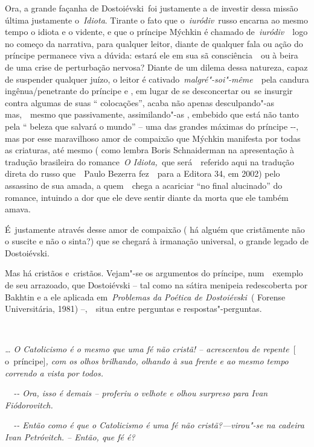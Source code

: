 Ora, a grande façanha de Dostoiévski~foi justamente a de investir dessa
missão última justamente o~\emph{Idiota}. Tirante o fato que
o\emph{~iuródiv}~russo encarna ao mesmo tempo o idiota e o vidente, e
que o príncipe Mýchkin é chamado de\emph{~iuródiv}~~logo no começo da
narrativa, para qualquer leitor, diante de qualquer fala ou ação do
príncipe permanece viva a dúvida: estará ele em sua sã consciência~~ou à
beira de uma crise de perturbação nervosa? Diante de um dilema dessa
natureza, capaz de suspender qualquer juízo, o leitor é
cativado~\emph{malgré"-soi"-même}~~pela candura ingênua/penetrante do
príncipe e , em lugar de se desconcertar ou~se insurgir contra algumas
de suas `` colocações'', acaba não apenas desculpando"-as mas,~~mesmo que
passivamente, assimilando"-as , embebido que está não tanto pela ``
beleza que salvará o mundo'' -- uma das grandes máximas do príncipe
-\/-, mas por esse maravilhoso amor de compaixão que Mýchkin manifesta
por todas as criaturas, até mesmo ( como lembra Boris Schnaiderman na
apresentação à tradução brasileira do romance~\emph{O Idiota,}~que
será~~referido aqui na tradução direta do russo que~~Paulo Bezerra
fez~~para a Editora 34, em 2002) pelo assassino de sua amada, a
quem~~chega a acariciar ``no final alucinado'' do romance, intuindo a
dor que ele deve sentir diante da morta que ele também amava.

É~justamente através desse amor de compaixão ( há alguém que cristãmente
não o suscite e não o sinta?) que se chegará à irmanação universal, o
grande legado de Dostoiévski.

Mas há cristãos e~cristãos. Vejam"-se os argumentos do príncipe,
num~~exemplo de seu arrazoado, que Dostoiévski -- tal como na sátira
menipeia redescoberta por Bakhtin e a ele aplicada em~\emph{Problemas da
Poética de Dostoiévski~}( Forense Universitária, 1981) --,~~situa entre
perguntas e respostas"-perguntas.

\emph{~}

\emph{\ldots{} O Catolicismo é o mesmo que uma fé não cristã! -- acrescentou
de repente~}{[} o\emph{~}príncipe{]}\emph{, com os olhos brilhando,
olhando à sua frente e ao mesmo tempo correndo a vista por todos.}

\emph{~~-\/- Ora, isso é demais -- proferiu o velhote e olhou surpreso
para Ivan Fiódorovitch.}

\emph{~~-\/- Então como é que o Catolicismo é uma fé não
cristã?---virou"-se na cadeira Ivan Petróvitch. -- Então, que fé é?}

